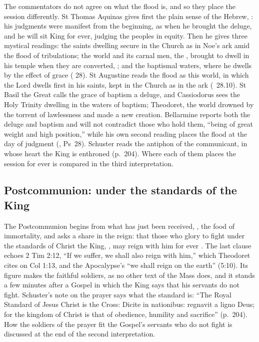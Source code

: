 The commentators do not agree on what the flood is, and so they place the
session differently. St Thomas Aquinas gives first the plain sense of the
Hebrew, : his judgments were manifest from the
beginning, as when he brought the deluge, and he will sit King for ever,
judging the peoples in equity. Then he gives three mystical readings: the saints dwelling secure in the
Church as in Noe's ark amid the flood of tribulations; the world and its carnal
men, the , brought to dwell in his temple when they are
converted, ; and the baptismal waters, where
he dwells by the effect of grace ( 28). St
Augustine reads the flood as this world, in which the Lord dwells first in his
saints, kept in the Church as in the ark (\ 28.10). St Basil
the Great calls the grace of baptism a deluge, and Cassiodorus sees the Holy
Trinity dwelling in the waters of baptism; Theodoret, the world drowned by the
torrent of lawlessness and made a new creation. Bellarmine reports both the
deluge and baptism and will not contradict those who hold them, ``being of
great weight and high position,'' while his own second reading places the
flood at the day of judgment (, Ps~28). Schuster reads the
antiphon of the communicant, in whose heart the King is enthroned (p.~204).
Where each of them places the session for ever is compared in the third
interpretation.

\subsection{Postcommunion: under the standards of the King}
\label{sec:element-postcommunion}

The Postcommunion begins from what has just been received, , the food of immortality, and asks a share in the reign: that those
who glory to fight under the standards of Christ the King, , may reign with him for ever .
The last clause echoes 2 Tim 2:12, ``If we suffer, we shall also reign with
him,'' which Theodoret cites on Col 1:13, and the Apocalypse's ``we shall
reign on the earth'' (5:10). Its figure makes the faithful soldiers, as no
other text of the Mass does, and it stands a few minutes after a Gospel in
which the King says that his servants do not fight. Schuster's note on the prayer says what the
standard is: ``The Royal Standard of Jesus Christ is the Cross: Dicite in
nationibus: regnavit a ligno Deus; for the kingdom of Christ is that of
obedience, humility and sacrifice'' (p.~204). How the soldiers of the prayer fit the Gospel's servants who do
not fight is discussed at the end of the second interpretation.
